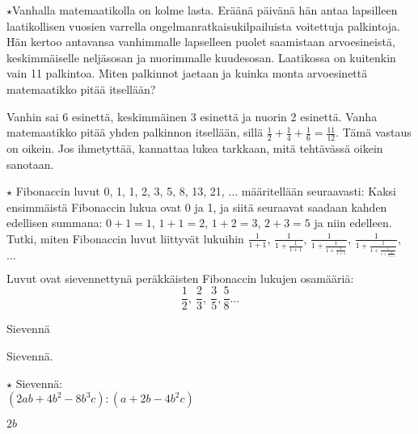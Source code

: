 \begin{tehtavasivu}
\begin{tehtava}
	$\star $Vanhalla matemaatikolla on kolme lasta. Eräänä päivänä hän antaa lapsilleen laatikollisen vuosien varrella ongelmanratkaisukilpailuista voitettuja palkintoja. Hän kertoo antavansa vanhimmalle lapselleen puolet saamistaan arvoesineistä, keskimmäiselle neljäsosan ja nuorimmalle kuudesosan. Laatikossa on kuitenkin vain 11 palkintoa. Miten  palkinnot jaetaan ja kuinka monta arvoesinettä matemaatikko pitää itsellään?
	\begin{vastaus}
		Vanhin sai 6 esinettä, keskimmäinen 3 esinettä ja nuorin 2 esinettä. Vanha
		matemaatikko pitää yhden palkinnon itsellään, sillä $\frac{1}{2} + \frac{1}{4}
		+ \frac{1}{6} = \frac{11}{12}$. Tämä vastaus on oikein. Jos ihmetyttää, kannattaa lukea tarkkaan, mitä tehtävässä oikein sanotaan.
	\end{vastaus}
\end{tehtava}

\begin{tehtava}
	$\star$ Fibonaccin luvut 0, 1, 1, 2, 3, 5, 8, 13, 21, $\ldots$ määritellään seuraavasti: Kaksi ensimmäistä
	Fibonaccin lukua ovat 0 ja 1, ja siitä seuraavat saadaan kahden
	edellisen summana: $0+1=1$, $1+1=2$, $1+2 = 3$, $2+3=5 $
	ja niin edelleen. 
	Tutki, miten Fibonaccin luvut liittyvät lukuihin
	$ \frac{1}{1+1}$, $\frac{1}{1+\frac{1}{1+1}}$, 
	$\frac{1}{1+\frac{1}{1+\frac{1}{1+1}}}$, 
	$\frac{1}{1+\frac{1}{1+\frac{1}{1+\frac{1}{1+1}}}}$, $\ldots\ $
	\begin{vastaus}
		Luvut ovat sievennettynä peräkkäisten Fibonaccin
		lukujen osamääriä:
		\[\frac{1}{2}, \ \frac{2}{3}, \ \frac{3}{5}, \frac{5}{8} \ldots  \]
	\end{vastaus}
\end{tehtava}

\begin{tehtava}
Sievennä

\begin{vastaus}
\end{vastaus}
\end{tehtava}

\begin{tehtava}
Sievennä.

\begin{vastaus}
\end{vastaus}
\end{tehtava}


\begin{tehtava} $\star$
Sievennä: \\
$(2ab+4b^2-8b^3c):(a+2b-4b^2c)$
	\begin{vastaus}
	$2b$
	\end{vastaus}
\end{tehtava}

\end{tehtavasivu}